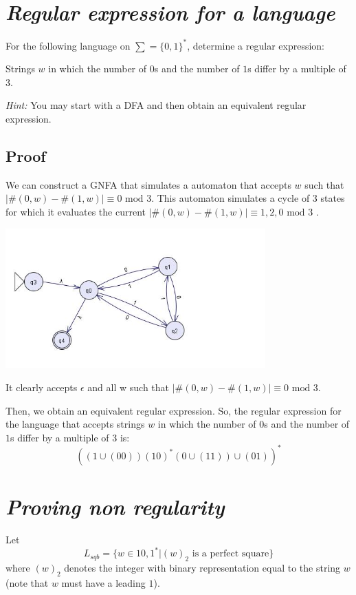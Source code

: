 \documentclass[12pt]{article}
\begin{document}
\section{\textit{Regular expression for a language}}
For the following language on $\sum = \{0,1\}^*$, determine a regular expression:

Strings $w$ in which the number of $0$s and the number of $1$s differ by a multiple of $3$.

\textit{Hint:} You may start with a DFA and then obtain an equivalent regular expression.

 \subsection{Proof}

We can construct a GNFA that simulates a automaton that accepts $w$ such that $|\#(0,w) - \#(1,w)| \equiv 0 \text{ mod } 3$. This automaton simulates a cycle of 3 states for which it  evaluates the current  $|\#(0,w) - \#(1,w)| \equiv 1, 2, 0 \text{ mod } 3$ . 

\begin{minipage}{\textwidth}
            \centering
            \includegraphics[width=0.75\textwidth]{Tarea 3 GNFA 2.a.jpg}
            \label{Enunciado Ej. 5}
        \end{minipage}

         It clearly accepts $\epsilon$ and all w such that $|\#(0,w) - \#(1,w)| \equiv 0 \text{ mod } 3$. 

         Then, we obtain an equivalent regular expression. So, the regular expression for the language that accepts strings $w$ in which the number of $0$s and the number of $1$s differ by a multiple of $3$ is:
\begin{equation*}
    ((1 \cup (00))(10)^*(0 \cup (11)) \cup (01))^*
\end{equation*}

\section{\textit{Proving non regularity}}
Let
\begin{equation*}
    L_{sqb}=\{w \in 1{0,1}^* | (w)_2 \text{ is a perfect square}\}
\end{equation*}
where $(w)_2$ denotes the integer with binary representation equal to the string $w$ (note that $w$ must have a leading $1$).
\end{document}
